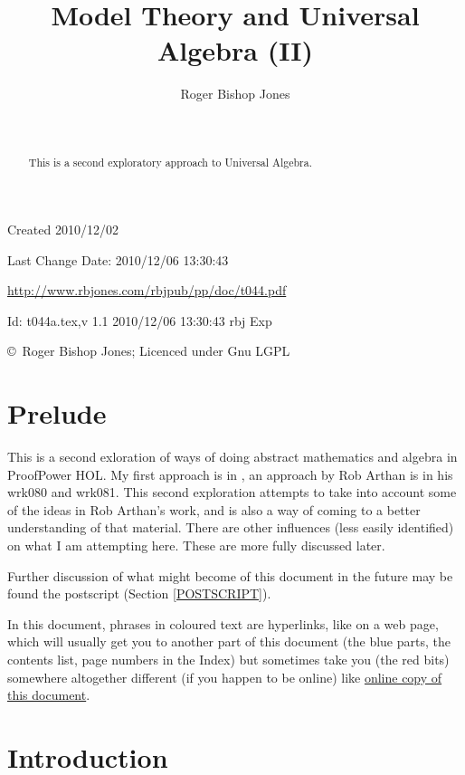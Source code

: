 \documentclass[11pt]{article}
\title{Model Theory and Universal Algebra (II)}
\author{Roger Bishop Jones}
\date{\ }
\begin{document}
\begin{titlepage}
\maketitle
\begin{abstract}
This is a second exploratory approach to Universal Algebra.
\end{abstract}
\vfill

\begin{centering}
{\footnotesize

Created 2010/12/02

Last Change $ $Date: 2010/12/06 13:30:43 $ $

\href{http://www.rbjones.com/rbjpub/pp/doc/t044.pdf}
{http://www.rbjones.com/rbjpub/pp/doc/t044.pdf}

$ $Id: t044a.tex,v 1.1 2010/12/06 13:30:43 rbj Exp $ $

\copyright\ Roger Bishop Jones; Licenced under Gnu LGPL

}%
\end{centering}

\thispagestyle{empty}
\end{titlepage}

\newpage
\addtocounter{page}{1}
{\parskip=0pt\tableofcontents}

\section{Prelude}

This is a second exloration of ways of doing abstract mathematics and algebra in ProofPower HOL.
My first approach is in \cite{rbjt039}, an approach by Rob Arthan is in his wrk080 and wrk081.
This second exploration attempts to take into account some of the ideas in Rob Arthan's work, and is also a way of coming to a better understanding of that material.
There are other influences (less easily identified) on what I am attempting here.
These are more fully discussed later.

Further discussion of what might become of this document in the future may be found the postscript (Section \ref{POSTSCRIPT}).

In this document, phrases in coloured text are hyperlinks, like on a web page, which will usually get you to another part of this document (the blue parts, the contents list, page numbers in the Index) but sometimes take you (the red bits) somewhere altogether different (if you happen to be online) like \href{http://rbjones.com/rbjpub/pp/doc/t044.pdf}{online copy of this document}.

\section{Introduction}
\end{document}
